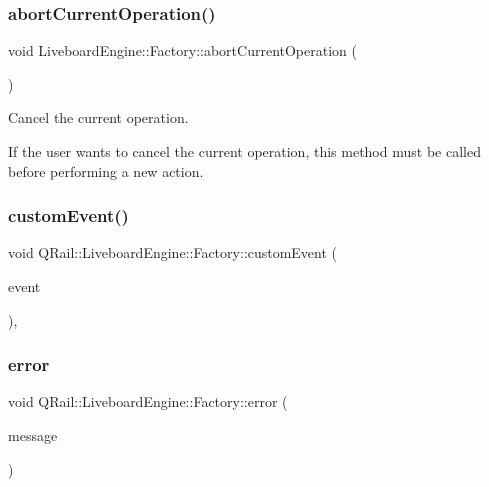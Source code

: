 \subsubsection{\texorpdfstring{abortCurrentOperation()}{abortCurrentOperation()}}
{\footnotesize\ttfamily void Liveboard\+Engine\+::\+Factory\+::abort\+Current\+Operation (\begin{DoxyParamCaption}{ }\end{DoxyParamCaption})}



Cancel the current operation. 

If the user wants to cancel the current operation, this method must be called before performing a new action. \mbox{\label{classQRail_1_1LiveboardEngine_1_1Factory_a214c37703d996797de42151ec41f55b2}} 
\subsubsection{\texorpdfstring{customEvent()}{customEvent()}}
{\footnotesize\ttfamily void Q\+Rail\+::\+Liveboard\+Engine\+::\+Factory\+::custom\+Event (\begin{DoxyParamCaption}\item[{Q\+Event $\ast$}]{event }\end{DoxyParamCaption})\hspace{0.3cm}{\ttfamily [protected]}, {\ttfamily [virtual]}}

\mbox{\label{classQRail_1_1LiveboardEngine_1_1Factory_a0c8fab5c22d9a46f00afea2fd9224421}} 
\subsubsection{\texorpdfstring{error}{error}}
{\footnotesize\ttfamily void Q\+Rail\+::\+Liveboard\+Engine\+::\+Factory\+::error (\begin{DoxyParamCaption}\item[{const Q\+String \&}]{message }\end{DoxyParamCaption})\hspace{0.3cm}{\ttfamily [signal]}}

